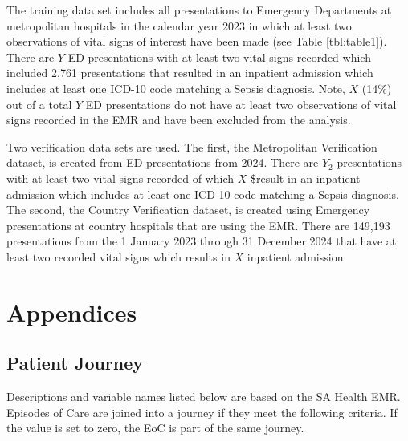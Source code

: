 \documentclass[
  a4paper,
  ,captions=tableheading
]{scrartcl}
\begin{document}
The training data set includes all presentations to Emergency
Departments at metropolitan hospitals in the calendar year 2023 in which
at least two observations of vital signs of interest have been made (see
Table \ref{tbl:table1}). There are \(Y\) ED presentations with at least
two vital signs recorded which included 2,761 presentations that
resulted in an inpatient admission which includes at least one ICD-10
code matching a Sepsis diagnosis. Note, \(X\) (14\%) out of a total
\(Y\) ED presentations do not have at least two observations of vital
signs recorded in the EMR and have been excluded from the analysis.

Two verification data sets are used. The first, the Metropolitan
Verification dataset, is created from ED presentations from 2024. There
are \(Y_2\) presentations with at least two vital signs recorded of
which \(X\) \$result in an inpatient admission which includes at least
one ICD-10 code matching a Sepsis diagnosis. The second, the Country
Verification dataset, is created using Emergency presentations at
country hospitals that are using the EMR. There are 149,193
presentations from the 1 January 2023 through 31 December 2024 that have
at least two recorded vital signs which results in \(X\) inpatient
admission.

\newpage

\section{Appendices}\label{appendices}

\subsection{Patient Journey}\label{sec:Journey}

Descriptions and variable names listed below are based on the SA Health
EMR. Episodes of Care are joined into a journey if they meet the
following criteria. If the value is set to zero, the EoC is part of the
same journey.
\end{document}
